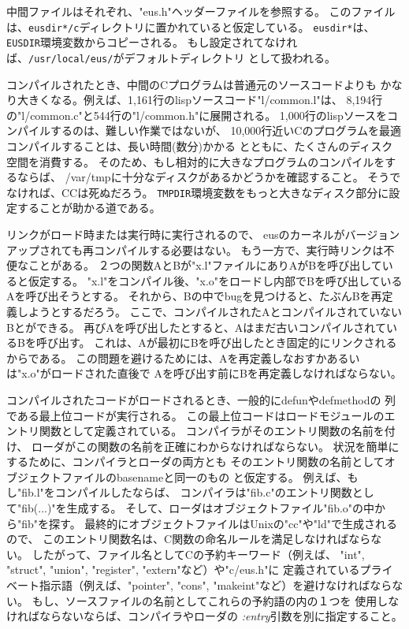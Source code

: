 中間ファイルはそれぞれ、"eus.h"ヘッダーファイルを参照する。
このファイルは、{\tt *eusdir*/c}ディレクトリに置かれていると仮定している。
{\tt *eusdir*}は、{\tt EUSDIR}環境変数からコピーされる。
もし設定されてなければ、{\tt /usr/local/eus/}がデフォルトディレクトリ
として扱われる。

コンパイルされたとき、中間のCプログラムは普通元のソースコードよりも
かなり大きくなる。例えば、1,161行のlispソースコード"l/common.l"は、
8,194行の"l/common.c"と544行の"l/common.h"に展開される。
1,000行のlispソースをコンパイルするのは、難しい作業ではないが、
10,000行近いCのプログラムを最適コンパイルすることは、長い時間(数分)かかる
とともに、たくさんのディスク空間を消費する。
そのため、もし相対的に大きなプログラムのコンパイルをするならば、
/var/tmpに十分なディスクがあるかどうかを確認すること。
そうでなければ、CCは死ぬだろう。
{\tt TMPDIR}環境変数をもっと大きなディスク部分に設定することが助かる道である。

リンクがロード時または実行時に実行されるので、
eusのカーネルがバージョンアップされても再コンパイルする必要はない。
もう一方で、実行時リンクは不便なことがある。
２つの関数AとBが"x.l"ファイルにありAがBを呼び出していると仮定する。
"x.l"をコンパイル後、"x.o"をロードし内部でBを呼び出しているAを呼び出そうとする。
それから、Bの中でbugを見つけると、たぶんBを再定義しようとするだろう。
ここで、コンパイルされたAとコンパイルされていないBとができる。
再びAを呼び出したとすると、Aはまだ古いコンパイルされているBを呼び出す。
これは、Aが最初にBを呼び出したとき固定的にリンクされるからである。
この問題を避けるためには、Aを再定義しなおすかあるいは"x.o"がロードされた直後で
Aを呼び出す前にBを再定義しなければならない。

コンパイルされたコードがロードされるとき、一般的にdefunやdefmethodの
列である最上位コードが実行される。
この最上位コードはロードモジュールのエントリ関数として定義されている。
コンパイラがそのエントリ関数の名前を付け、
ローダがこの関数の名前を正確にわからなければならない。
状況を簡単にするために、コンパイラとローダの両方とも
そのエントリ関数の名前としてオブジェクトファイルのbasenameと同一のもの
と仮定する。
例えば、もし"fib.l"をコンパイルしたならば、
コンパイラは"fib.c"のエントリ関数として"fib(...)"を生成する。
そして、ローダはオブジェクトファイル"fib.o"の中から"fib"を探す。
最終的にオブジェクトファイルはUnixの"cc"や"ld"で生成されるので、
このエントリ関数名は、C関数の命名ルールを満足しなければならない。
したがって、ファイル名としてCの予約キーワード（例えば、
"int", "struct", "union", "register", "extern"など）や"c/eus.h"に
定義されているプライベート指示語（例えば、"pointer", "cons",
"makeint"など）を避けなければならない。
もし、ソースファイルの名前としてこれらの予約語の内の１つを
使用しなければならないならば、コンパイラやローダの
{\em :entry}引数を別に指定すること。


